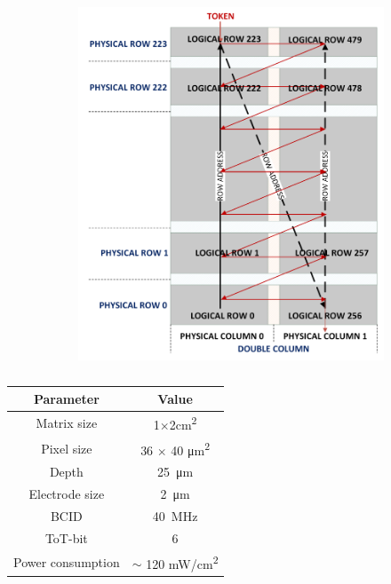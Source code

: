 \begin{figure}[h!]
\begin{subfigure}{.5\textwidth}
    \includegraphics[width=.88\linewidth]{figures/Monopix1/column_order.png}
    \caption{}
    \label{fig:column_order}
    \end{subfigure}
\end{figure}

\begin{table}
    \begin{center}
    \begin{tabular}{| c |c |}
    \hline
    Parameter & Value\\
    \hline
    \hline
    Matrix size &  1$\times$2\si{cm\squared}\\
    Pixel size & 36 $\times$ 40 \si{\um\squared}\\
    Depth & \SI{25}{\um}\\
    Electrode size & \SI{2}{\um}\\
    BCID & \SI{40}{MHz} \\
    ToT-bit & 6 \\
    Power consumption & $\sim$ 120 \si{mW/cm\squared}\\    
    \hline
    \end{tabular}
    \caption{}
    \label{tab:LF-TJ-Monopix}
    \end{center}
\end{table}


